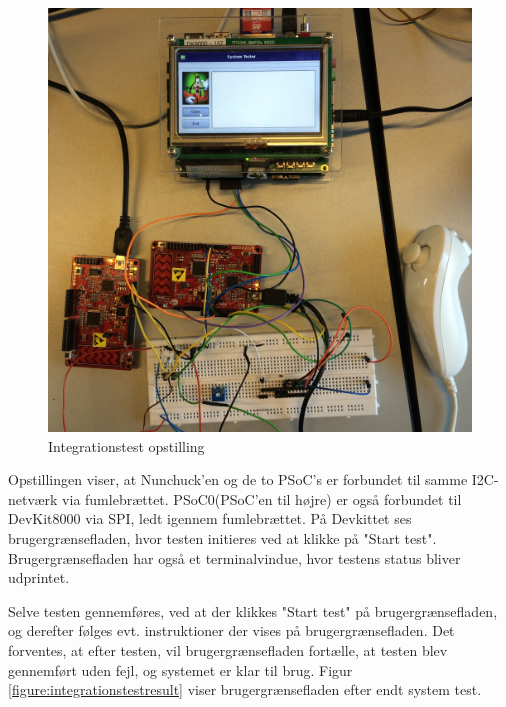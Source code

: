 \begin{figure}[H]
	\includegraphics[width=\textwidth]{Test/images/IntegrationstestProtokoller/opstilling}
	\caption{Integrationstest opstilling}
	\label{figure:IntegrationstestOpstilling}
\end{figure}

Opstillingen viser, at Nunchuck'en og de to PSoC's er forbundet til samme I2C-netværk via fumlebrættet. PSoC0(PSoC'en til højre) er også forbundet til DevKit8000 via SPI, ledt igennem fumlebrættet. På Devkittet ses brugergrænsefladen, hvor testen initieres ved at klikke på "Start test". Brugergrænsefladen har også et terminalvindue, hvor testens status bliver udprintet.

Selve testen gennemføres, ved at der klikkes "Start test" på brugergrænsefladen, og derefter følges evt. instruktioner der vises på brugergrænsefladen. Det forventes, at efter testen, vil brugergrænsefladen fortælle, at testen blev gennemført uden fejl, og systemet er klar til brug. Figur \ref{figure:integrationstestresult} viser brugergrænsefladen efter endt system test.

